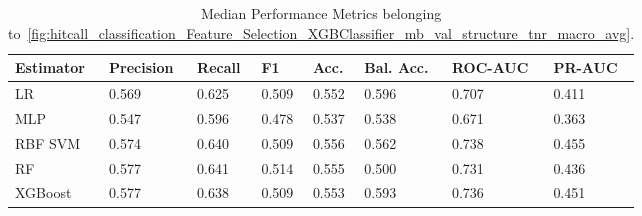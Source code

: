 \begin{longtable}{llllllll}
\caption{Median Performance Metrics belonging to~\ref{fig:hitcall_classification_Feature_Selection_XGBClassifier_mb_val_structure_tnr_macro_avg}.}\label{tab:table:hitcall_classification_feature_selection_xgbclassifier_mb_val_structure_tnr_macro_avg}\\
\toprule
\midrule
\small Estimator & \small Precision & \small Recall & \small F1 & \small Acc. & \small Bal. Acc. & \small ROC-AUC & \small PR-AUC\\
\hline
LR & 0.569 & 0.625 & 0.509 & 0.552 & 0.596 & 0.707 & 0.411\\
MLP & 0.547 & 0.596 & 0.478 & 0.537 & 0.538 & 0.671 & 0.363\\
RBF SVM & 0.574 & 0.640 & 0.509 & 0.556 & 0.562 & 0.738 & 0.455\\
RF & 0.577 & 0.641 & 0.514 & 0.555 & 0.500 & 0.731 & 0.436\\
XGBoost & 0.577 & 0.638 & 0.509 & 0.553 & 0.593 & 0.736 & 0.451\\
\bottomrule
\end{longtable}